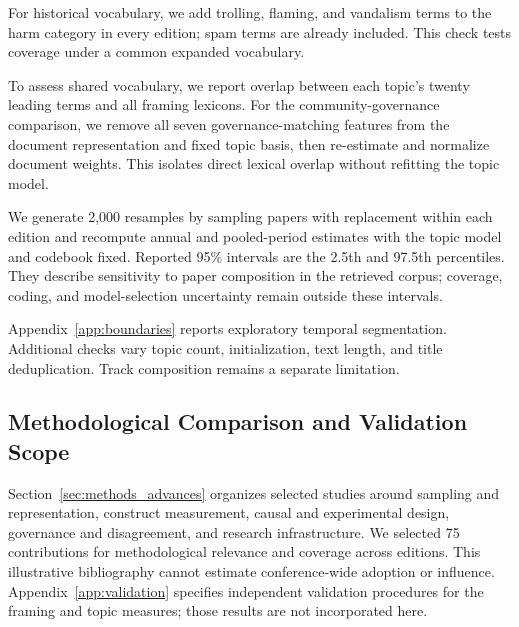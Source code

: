 For historical vocabulary, we add trolling, flaming, and vandalism terms to the harm category in every edition; spam terms are already included. This check tests coverage under a common expanded vocabulary.

To assess shared vocabulary, we report overlap between each topic's twenty leading terms and all framing lexicons. For the community-governance comparison, we remove all seven governance-matching features from the document representation and fixed topic basis, then re-estimate and normalize document weights. This isolates direct lexical overlap without refitting the topic model.

We generate 2,000 resamples by sampling papers with replacement within each edition and recompute annual and pooled-period estimates with the topic model and codebook fixed. Reported 95\% intervals are the 2.5th and 97.5th percentiles. They describe sensitivity to paper composition in the retrieved corpus; coverage, coding, and model-selection uncertainty remain outside these intervals.

Appendix~\ref{app:boundaries} reports exploratory temporal segmentation. Additional checks vary topic count, initialization, text length, and title deduplication. Track composition remains a separate limitation.

\subsection{Methodological Comparison and Validation Scope}
Section~\ref{sec:methods_advances} organizes selected studies around sampling and representation, construct measurement, causal and experimental design, governance and disagreement, and research infrastructure. We selected 75 contributions for methodological relevance and coverage across editions. This illustrative bibliography cannot estimate conference-wide adoption or influence. Appendix~\ref{app:validation} specifies independent validation procedures for the framing and topic measures; those results are not incorporated here.
